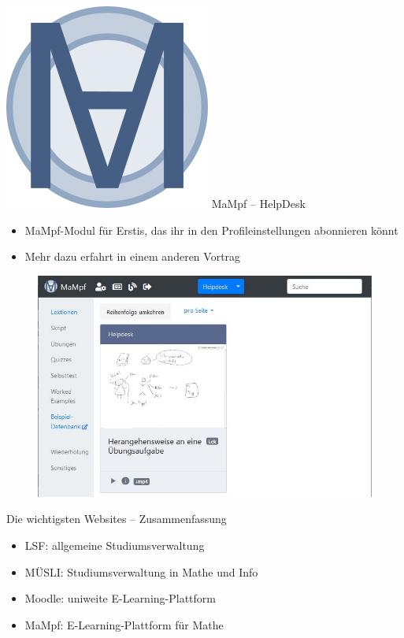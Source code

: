 \begin{frame}{\includegraphics[scale=0.072]{images/mampf.png} MaMpf -- HelpDesk}
      \begin{itemize}
            \item{MaMpf-Modul für Erstis, das ihr in den Profileinstellungen
            abonnieren könnt}
            \item{Mehr dazu erfahrt in einem anderen Vortrag}
      \end{itemize}
      \begin{figure}
            \centering
            \includegraphics[scale=0.35]{images/mampf27.jpg}
      \end{figure}
\end{frame}

\begin{frame}{Die wichtigsten Websites -- Zusammenfassung}
    \large
    \begin{itemize}
        \item LSF: allgemeine Studiumsverwaltung
        \item MÜSLI: Studiumsverwaltung in Mathe und Info
        \item Moodle: uniweite E-Learning-Plattform
        \item MaMpf: E-Learning-Plattform für Mathe
    \end{itemize}
\end{frame}

